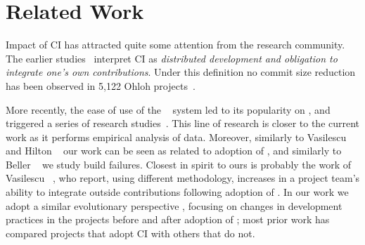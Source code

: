 
\section{Related Work}
\label{sec:rw}

Impact of CI has attracted quite some attention from the research 
community. %
The earlier studies~\cite{HolckJ03,Deshpande2008} interpret CI as \emph{distributed development and obligation 
to integrate one's own contributions}. %
Under this definition %
no commit size reduction has been observed in 5,122 Ohloh projects~\cite{Deshpande2008}. 

More recently, the ease of use of the \Tvis~\cite{TravisCI} system led to its 
popularity on \GH, and triggered a series of research studies~\cite{era14, 
VasilescuYWDF15, yue2015wait, BellerGZ16, Hilton2016, Yu2016}.
This line of research is closer to the current work as it performs empirical
analysis of \Tvis data. Moreover, similarly to Vasilescu \etal~\cite{era14}
and Hilton \etal~\cite{Hilton2016} our work can be seen as related to adoption of \Tvis,
and similarly to Beller \etal~\cite{BellerGZ16} we study build failures.
Closest in spirit to ours is probably the work of Vasilescu \etal~\cite{VasilescuYWDF15},
who report, using different methodology, increases in a project team's ability 
to integrate outside contributions following adoption of \Tvis.
In our work we adopt a similar evolutionary perspective%
, focusing on changes in development practices in the projects  before 
and after adoption of \Tvis;
most prior work has %
compared
projects that adopt CI with others that do not.

